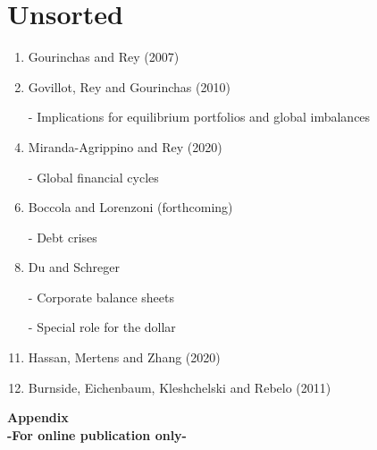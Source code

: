 \documentclass[12pt,letter]{article}
\theoremstyle{break} \theorembodyfont{\normalfont\itshape}
\theoremstyle{break}
\theoremstyle{break} \theorembodyfont{\normalfont\itshape}
\theoremstyle{break} \theorembodyfont{\normalfont\itshape}
\begin{document}
\section{Unsorted}
\begin{enumerate}
\item Gourinchas and Rey (2007)
\item Govillot, Rey and Gourinchas (2010)
\item[-] Implications for equilibrium portfolios and global imbalances
\item Miranda-Agrippino and Rey (2020)
\item[-] Global financial cycles
\item Boccola and Lorenzoni (forthcoming)
\item[-] Debt crises
\item Du and Schreger
\item[-] Corporate balance sheets
\item[-] Special role for the dollar
\item Hassan, Mertens and Zhang (2020)
\item Burnside, Eichenbaum, Kleshchelski and Rebelo (2011)
\end{enumerate}


\newpage


 

\clearpage

\begin{center}
  {\Huge\bf Appendix}\\
  {\large\bf -For online publication only-}
\end{center}

    
\end{document}
